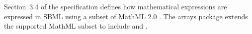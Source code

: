 Section~3.4 of the \sbmlthreecore specification defines how mathematical expressions are expressed in SBML using a subset of MathML 2.0 \citep{w3c:2000b}.
The arrays package extends the supported MathML subset to include  and .
